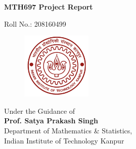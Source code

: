 \clearpage
\begin{titlepage}
\maketitle
\thispagestyle{empty}
\centering
\Large{\textbf{MTH697 Project Report}}

\large{
Roll No.: 208160499\\
}
\vspace{0.5cm}
\begin{figure}[h!]
    \centering
    \includegraphics[width=0.3\textwidth,keepaspectratio]{images/redlogo.jpg}
\end{figure}


\large{
Under the Guidance of\\
\textbf{Prof. Satya Prakash Singh}\\
Department of Mathematics \& Statistics,\\
Indian Institute of Technology Kanpur\\
}
\end{titlepage}
